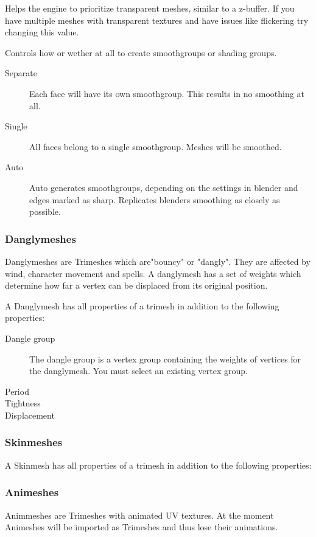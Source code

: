 Helps the engine to prioritize transparent meshes, similar to a z-buffer. If
you have multiple meshes with transparent textures and have issues like
flickering try changing this value.

Controls how or wether at all to create smoothgroups or shading groups.
\begin{description}
    \item[Separate] Each face will have its own smoothgroup. This results in no smoothing at all.
    \item[Single] All faces belong to a single smoothgroup. Meshes will be smoothed.
    \item[Auto] Auto generates smoothgroups, depending on the settings in blender and edges marked as sharp. Replicates blenders smoothing as closely as possible.
\end{description}

\subsubsection{Danglymeshes}
Danglymeshes are Trimeshes which are"bouncy" or "dangly". They are affected by
wind, character movement and spells. A danglymesh has a set of weights which
determine how far a vertex can be displaced from its original position.

A Danglymesh has all properties of a trimesh in addition to the following
properties:
\begin{description}
    \item[Dangle group] The dangle group is a vertex group containing the weights of vertices for the danglymesh. You must select an existing vertex group.
    \item[Period]
    \item[Tightness]
    \item[Displacement]
\end{description}

\subsubsection{Skinmeshes}
A Skinmesh has all properties of a trimesh in addition to the following
properties:

\subsubsection{Animeshes}
Animmeshes are Trimeshes with animated UV textures. At the moment Animeshes
will be imported as Trimeshes and thus lose their animations.

